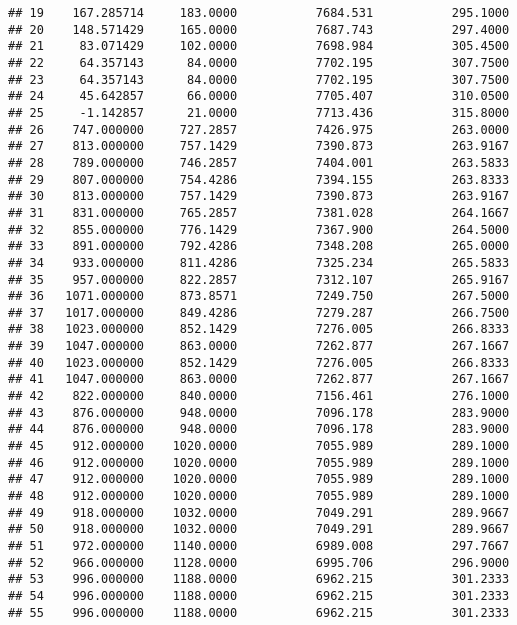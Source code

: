 \documentclass[]{article}
\begin{document}
\begin{verbatim}
## 19    167.285714     183.0000           7684.531           295.1000
## 20    148.571429     165.0000           7687.743           297.4000
## 21     83.071429     102.0000           7698.984           305.4500
## 22     64.357143      84.0000           7702.195           307.7500
## 23     64.357143      84.0000           7702.195           307.7500
## 24     45.642857      66.0000           7705.407           310.0500
## 25     -1.142857      21.0000           7713.436           315.8000
## 26    747.000000     727.2857           7426.975           263.0000
## 27    813.000000     757.1429           7390.873           263.9167
## 28    789.000000     746.2857           7404.001           263.5833
## 29    807.000000     754.4286           7394.155           263.8333
## 30    813.000000     757.1429           7390.873           263.9167
## 31    831.000000     765.2857           7381.028           264.1667
## 32    855.000000     776.1429           7367.900           264.5000
## 33    891.000000     792.4286           7348.208           265.0000
## 34    933.000000     811.4286           7325.234           265.5833
## 35    957.000000     822.2857           7312.107           265.9167
## 36   1071.000000     873.8571           7249.750           267.5000
## 37   1017.000000     849.4286           7279.287           266.7500
## 38   1023.000000     852.1429           7276.005           266.8333
## 39   1047.000000     863.0000           7262.877           267.1667
## 40   1023.000000     852.1429           7276.005           266.8333
## 41   1047.000000     863.0000           7262.877           267.1667
## 42    822.000000     840.0000           7156.461           276.1000
## 43    876.000000     948.0000           7096.178           283.9000
## 44    876.000000     948.0000           7096.178           283.9000
## 45    912.000000    1020.0000           7055.989           289.1000
## 46    912.000000    1020.0000           7055.989           289.1000
## 47    912.000000    1020.0000           7055.989           289.1000
## 48    912.000000    1020.0000           7055.989           289.1000
## 49    918.000000    1032.0000           7049.291           289.9667
## 50    918.000000    1032.0000           7049.291           289.9667
## 51    972.000000    1140.0000           6989.008           297.7667
## 52    966.000000    1128.0000           6995.706           296.9000
## 53    996.000000    1188.0000           6962.215           301.2333
## 54    996.000000    1188.0000           6962.215           301.2333
## 55    996.000000    1188.0000           6962.215           301.2333

\end{verbatim}
\end{document}
